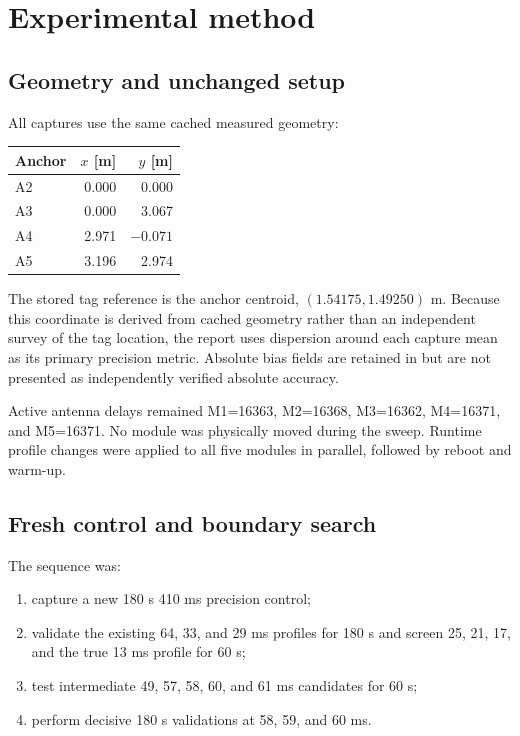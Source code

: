 \documentclass[11pt,a4paper]{article}
\begin{document}
\section{Experimental method}

\subsection{Geometry and unchanged setup}

All captures use the same cached measured geometry:

\begin{center}
\begin{tabular}{lrr}
  \toprule
  Anchor & $x$ [m] & $y$ [m]\\
  \midrule
  A2 & 0.000 & 0.000\\
  A3 & 0.000 & 3.067\\
  A4 & 2.971 & $-0.071$\\
  A5 & 3.196 & 2.974\\
  \bottomrule
\end{tabular}
\end{center}

The stored tag reference is the anchor centroid,
$(1.54175,1.49250)$ m. Because this coordinate is derived from cached
geometry rather than an independent survey of the tag location, the report
uses dispersion around each capture mean as its primary precision metric.
Absolute bias fields are retained in  but are not presented
as independently verified absolute accuracy.

Active antenna delays remained M1=16363, M2=16368, M3=16362, M4=16371, and
M5=16371. No module was physically moved during the sweep. Runtime profile
changes were applied to all five modules in parallel, followed by reboot and
warm-up.

\subsection{Fresh control and boundary search}

The sequence was:

\begin{enumerate}[leftmargin=8mm]
  \item capture a new 180 s 410 ms precision control;
  \item validate the existing 64, 33, and 29 ms profiles for 180 s and screen
  25, 21, 17, and the true 13 ms profile for 60 s;
  \item test intermediate 49, 57, 58, 60, and 61 ms candidates for 60 s;
  \item perform decisive 180 s validations at 58, 59, and 60 ms.
\end{enumerate}
\end{document}
